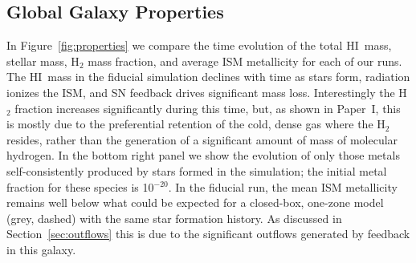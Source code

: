 \documentclass[twocolumn]{aastex62}
\newcommand{\HI}{HI}
\begin{document}
\subsection{Global Galaxy Properties}
\label{sec:galaxy properties}

In Figure~\ref{fig:properties} we compare the time evolution of the total \HI~mass, stellar mass, H$_2$ mass fraction, and average ISM metallicity for each of our runs. The \HI~mass in the fiducial simulation declines with time as stars form, radiation ionizes the ISM, and SN feedback drives significant mass loss. Interestingly the H$_2$ fraction increases significantly during this time, but, as shown in Paper~I, this is mostly due to the preferential retention of the cold, dense gas where the H$_2$ resides, rather than the generation of a significant amount of mass of molecular hydrogen. In the bottom right panel we show the evolution of only those metals self-consistently produced by stars formed in the simulation; the initial metal fraction for these species is 10$^{-20}$. In the fiducial run, the mean ISM metallicity remains well below what could be expected for a closed-box, one-zone model (grey, dashed) with the same star formation history. As discussed in Section~\ref{sec:outflows} this is due to the significant outflows generated by feedback in this galaxy. 
\end{document}
